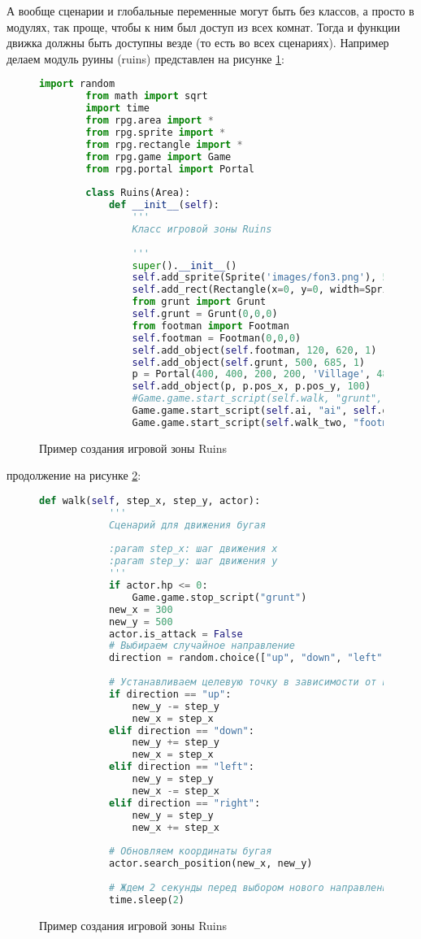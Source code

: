 А вообще сценарии и глобальные переменные могут быть без классов, а просто в модулях, так проще, чтобы к ним был доступ из всех комнат. Тогда и функции движка должны быть доступны везде (то есть во всех сценариях). Например делаем модуль руины (ruins) представлен на рисунке \ref{ruins:image}:
\begin{figure}[H]
	\begin{lstlisting}[language=Python]
		import random
		from math import sqrt
		import time
		from rpg.area import *
		from rpg.sprite import *
		from rpg.rectangle import *
		from rpg.game import Game
		from rpg.portal import Portal
		
		class Ruins(Area):
			def __init__(self):
				'''
				Класс игровой зоны Ruins
				
				'''
				super().__init__()
				self.add_sprite(Sprite('images/fon3.png'), 590, 400, 0)
				self.add_rect(Rectangle(x=0, y=0, width=Sprite('images/fon3.png').image.width(), height=Sprite('images/fon3.png').image.height()))
				from grunt import Grunt
				self.grunt = Grunt(0,0,0)
				from footman import Footman
				self.footman = Footman(0,0,0)
				self.add_object(self.footman, 120, 620, 1)
				self.add_object(self.grunt, 500, 685, 1)
				p = Portal(400, 400, 200, 200, 'Village', 480, 100)
				self.add_object(p, p.pos_x, p.pos_y, 100)
				#Game.game.start_script(self.walk, "grunt", 50, 50)
				Game.game.start_script(self.ai, "ai", self.grunt)
				Game.game.start_script(self.walk_two, "footman", 50, 50)
\end{lstlisting}  
\caption{Пример создания игровой зоны Ruins}
\label{ruins:image}
\end{figure}
продолжение на рисунке \ref{ruins5:image}:
\begin{figure}[H]
	\begin{lstlisting}[language=Python]	
		def walk(self, step_x, step_y, actor):
			'''
			Сценарий для движения бугая
			
			:param step_x: шаг движения x
			:param step_y: шаг движения y
			'''
			if actor.hp <= 0:
				Game.game.stop_script("grunt")
			new_x = 300
			new_y = 500
			actor.is_attack = False
			# Выбираем случайное направление
			direction = random.choice(["up", "down", "left", "right"])
			
			# Устанавливаем целевую точку в зависимости от направления
			if direction == "up":
				new_y -= step_y
				new_x = step_x
			elif direction == "down":
				new_y += step_y
				new_x = step_x
			elif direction == "left":
				new_y = step_y
				new_x -= step_x
			elif direction == "right":
				new_y = step_y
				new_x += step_x
			
			# Обновляем координаты бугая
			actor.search_position(new_x, new_y)
			
			# Ждем 2 секунды перед выбором нового направления
			time.sleep(2)
	\end{lstlisting}  
	\caption{Пример создания игровой зоны Ruins}
	\label{ruins5:image}
\end{figure}
